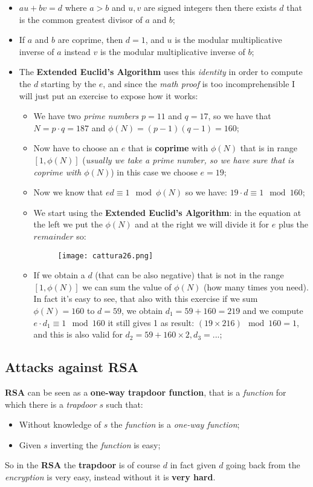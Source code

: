 \documentclass{article}
\begin{document}
\begin{itemize}
\item $au + bv = d$ where $a>b$ and $u,v$ are signed integers then there exists $d$ that is the common greatest divisor of $a$ and $b$;
\item If $a$ and $b$ are coprime, then $d=1$, and $u$ is the modular multiplicative inverse of $a$ instead $v$ is the modular multiplicative inverse of $b$; 
\item The \textbf{Extended Euclid's Algorithm} uses this \emph{identity} in order to compute the $d$ starting by the $e$, and since the \emph{math proof} is too incomprehensible I will just put an exercise to expose how it works:
\begin{itemize}
\item We have two \emph{prime numbers} $p=11$ and $q=17$, so we have that $N= p\cdot q = 187$ and $\phi(N) = (p-1)(q-1) = 160$;
\item Now have to choose an $e$ that is \textbf{coprime} with $\phi(N)$ that is in range $\left [1, \phi(N) \right]$ (\emph{usually we take a prime number, so we have sure that is coprime with $\phi(N)$}) in this case we choose $e=19$;
\item Now we know that $ed \equiv 1 \mod \phi(N)$ so we have: $19 \cdot d \equiv 1 \mod 160$;
\item We start using the \textbf{Extended Euclid's Algorithm}: in the equation at the left we put the $\phi(N)$ and at the right we will divide it for $e$ plus the $remainder$ so:
\begin{figure}[H]
  \centering
  \texttt{[image: cattura26.png]}
\end{figure}
\item If we obtain a $d$ (that can be also negative) that is not in the range $\left[1,\phi(N) \right]$ we can sum the value of $\phi(N)$ (how many times you need). In fact it's easy to see, that also with this exercise if we sum $\phi(N)=160$ to $d=59$, we obtain $d_1 = 59+160= 219$ and we compute $e\cdot d_1 \equiv 1 \mod 160$ it still gives 1 as result: $(19 \times 216)\mod 160 = 1$, and this is also valid for $d_2= 59 + 160 \times 2, d_3 = ...$;
\end{itemize}
\end{itemize}
\subsection{Attacks against RSA}
\textbf{RSA} can be seen as a \textbf{one-way trapdoor function}, that is a \emph{function} for which there is a \emph{trapdoor} $s$ such that:
\begin{itemize}
\item Without knowledge of $s$ the \emph{function} is a \emph{one-way function};
\item Given $s$ inverting the \emph{function} is easy;
\end{itemize}
So in the \textbf{RSA} the \textbf{trapdoor} is of course $d$ in fact given $d$ going back from the \emph{encryption} is very easy, instead without it is \textbf{very hard}. 
\end{document}
